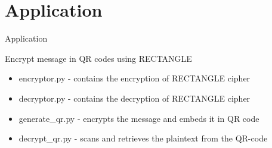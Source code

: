 \section{Application}

\begin{frame}{Application}
\begin{block}{}
    Encrypt message in QR codes using RECTANGLE
    \begin{itemize}
        \item encryptor.py - contains the encryption of RECTANGLE cipher 
        \item decryptor.py - contains the decryption of RECTANGLE cipher
        \item generate\_qr.py - encrypts the message and embeds it in QR code
        \item decrypt\_qr.py - scans and retrieves the plaintext from the QR-code
    \end{itemize}
        
\end{block}
\end{frame}

